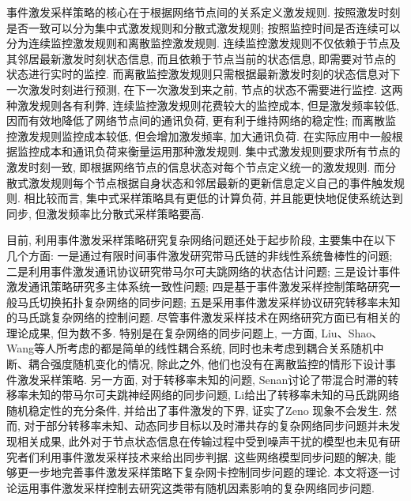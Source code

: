 事件激发采样策略的核心在于根据网络节点间的关系定义激发规则. 按照激发时刻是否一致可以分为集中式激发规则和分散式激发规则; 按照监控时间是否连续可以分为连续监控激发规则和离散监控激发规则. 连续监控激发规则不仅依赖于节点及其邻居最新激发时刻状态信息, 而且依赖于节点当前的状态信息, 即需要对节点的状态进行实时的监控. 而离散监控激发规则只需根据最新激发时刻的状态信息对下一次激发时刻进行预测, 在下一次激发到来之前, 节点的状态不需要进行监控. 这两种激发规则各有利弊, 连续监控激发规则花费较大的监控成本, 但是激发频率较低, 因而有效地降低了网络节点间的通讯负荷, 更有利于维持网络的稳定性; 而离散监控激发规则监控成本较低, 但会增加激发频率, 加大通讯负荷. 在实际应用中一般根据监控成本和通讯负荷来衡量运用那种激发规则. 集中式激发规则要求所有节点的激发时刻一致, 即根据网络节点的信息状态对每个节点定义统一的激发规则. 而分散式激发规则每个节点根据自身状态和邻居最新的更新信息定义自己的事件触发规则. 相比较而言, 集中式采样策略具有更低的计算负荷, 并且能更快地促使系统达到同步, 但激发频率比分散式采样策略要高.

目前, 利用事件激发采样策略研究复杂网络问题还处于起步阶段, 主要集中在以下几个方面: 一是通过有限时间事件激发研究带马氏链的非线性系统鲁棒性的问题; 二是利用事件激发通讯协议研究带马尔可夫跳网络的状态估计问题; 三是设计事件激发通讯策略研究多主体系统一致性问题; 四是基于事件激发采样控制策略研究一般马氏切换拓扑复杂网络的同步问题; 五是采用事件激发采样协议研究转移率未知的马氏跳复杂网络的控制问题. 尽管事件激发采样技术在网络研究方面已有相关的理论成果, 但为数不多. 特别是在复杂网络的同步问题上, 一方面, Liu、Shao、Wang等人所考虑的都是简单的线性耦合系统, 同时也未考虑到耦合关系随机中断、耦合强度随机变化的情况, 除此之外, 他们也没有在离散监控的情形下设计事件激发采样策略. 另一方面, 对于转移率未知的问题, Senan讨论了带混合时滞的转移率未知的带马尔可夫跳神经网络的同步问题, Li给出了转移率未知的马氏跳网络随机稳定性的充分条件, 并给出了事件激发的下界, 证实了Zeno 现象不会发生. 然而, 对于部分转移率未知、动态同步目标以及时滞共存的复杂网络同步问题并未发现相关成果, 此外对于节点状态信息在传输过程中受到噪声干扰的模型也未见有研究者们利用事件激发采样技术来给出同步判据. 这些网络模型同步问题的解决, 能够更一步地完善事件激发采样策略下复杂网卡控制同步问题的理论. 本文将逐一讨论运用事件激发采样控制去研究这类带有随机因素影响的复杂网络同步问题.

